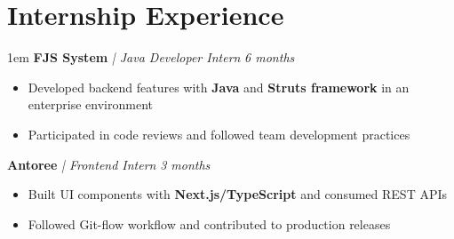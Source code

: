 \documentclass[11pt,a4paper]{article}
\begin{document}
\section{Internship Experience}
\begin{adjustwidth}{1em}{}
	\small
	\textbf{FJS System} \textit{| Java Developer Intern} \hfill \textit{6 months}
	\begin{itemize}
		\item Developed backend features with \textbf{Java} and \textbf{Struts framework} in an enterprise environment
		\item Participated in code reviews and followed team development practices
	\end{itemize}

	\vspace{0.3em}

	\textbf{Antoree} \textit{| Frontend Intern} \hfill \textit{3 months}
	\begin{itemize}
		\item Built UI components with \textbf{Next.js/TypeScript} and consumed REST APIs
		\item Followed Git-flow workflow and contributed to production releases
	\end{itemize}
\end{adjustwidth}
\end{document}
